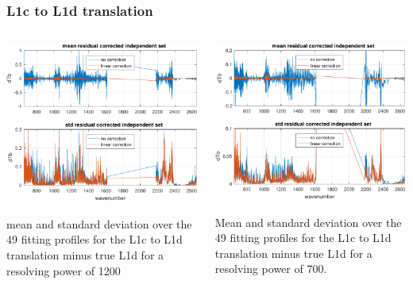 \documentclass[10pt]{beamer}
\begin{document}
\begin{frame}
\frametitle{L1c to L1d translation}
\begin{columns}[t]
\begin{column}{0.5\textwidth}
  \begin{centering}
  \includegraphics[width=\textwidth]{figures/L1d_cor1_1200.pdf}
  \end{centering}\vspace{3mm}
  mean and standard deviation over the 49 fitting profiles for the
  L1c to L1d translation minus true L1d for a resolving power of
  1200

\end{column}
\begin{column}{0.5\textwidth}  
  \begin{centering}
  \includegraphics[width=\textwidth]{figures/L1d_cor1_700.pdf}
  \end{centering}\vspace{3mm}
  Mean and standard deviation over the 49 fitting profiles for the
  L1c to L1d translation minus true L1d for a resolving power of 700.
 

\end{column}
\end{columns}
\end{frame}
\end{document}
